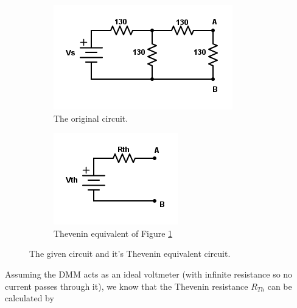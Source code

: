 \documentclass[11pt]{article}
\begin{document}
    \begin{figure}[H]
        \centering
        \begin{subfigure}{0.4\textwidth}
            \centering
            \includegraphics[width=\textwidth]{1a_original.png}
            \caption{The original circuit.}
            \label{fig:1a_original}
        \end{subfigure}
        \begin{subfigure}{0.4\textwidth}
            \centering
            \includegraphics[width=\textwidth]{1a_thevenin.png}
            \caption{Thevenin equivalent of Figure \ref{fig:1a_original}}
            \label{fig:1a_thevenin}
        \end{subfigure}
        \caption{The given circuit and it's Thevenin equivalent circuit.}
    \end{figure}

    Assuming the DMM acts as an ideal voltmeter (with infinite resistance so no current passes through it), we know that the Thevenin resistance \(R_{Th}\) can be calculated by \\
\end{document}
